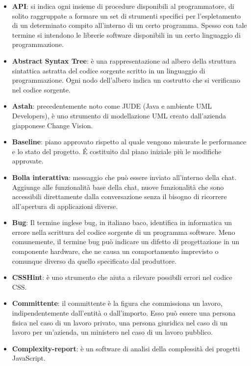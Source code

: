 \begin{itemize}
\item[] \textbf{API}: si indica ogni insieme di procedure disponibili al programmatore, di solito raggruppate a formare un set di strumenti specifici per l'espletamento di un determinato compito all'interno di un certo programma. Spesso con tale termine si intendono le librerie software disponibili in un certo linguaggio di programmazione.
\item[] \textbf{Abstract Syntax Tree}: è una rappresentazione ad albero della struttura sintattica astratta del codice sorgente scritto in un linguaggio di programmazione. Ogni nodo dell'albero indica un costrutto che si verificano nel codice sorgente.
\item[] \textbf{Astah}: precedentemente noto come JUDE (Java e ambiente UML Developers), è uno strumento di modellazione UML creato dall'azienda giapponese Change Vision.
\end{itemize}
\newpage

\begin{itemize}
\item[] \textbf{Baseline}: piano approvato rispetto al quale vengono misurate le performance e lo stato del progetto. \'E costituito dal piano iniziale più le modifiche approvate.
\item[] \textbf{Bolla interattiva}: messaggio che può essere inviato all'interno della chat. Aggiunge alle funzionalità base della chat, nuove funzionalità che sono accessibili direttamente dalla conversazione senza il bisogno di ricorrere all'apertura di applicazioni diverse.
\item[] \textbf{Bug}: Il termine inglese bug, in italiano baco, identifica in informatica un errore nella scrittura del codice sorgente di un programma software. Meno comunemente, il termine bug può indicare un difetto di progettazione in un componente hardware, che ne causa un comportamento imprevisto o comunque diverso da quello specificato dal produttore.
\end{itemize}
\newpage

\begin{itemize}
\item[] \textbf{CSSHint}: è uno strumento che aiuta a rilevare possibili errori nel codice CSS.
\item[] \textbf{Committente}: il committente è la figura che commissiona un lavoro, indipendentemente dall'entità o dall'importo. Esso può essere una persona fisica nel caso di un lavoro privato, una persona giuridica nel caso di un lavoro per un'azienda, un ministero nel caso di un lavoro pubblico.
\item[] \textbf{Complexity-report}: è un software di analisi della complessità dei progetti JavaScript.
\end{itemize}
\newpage

